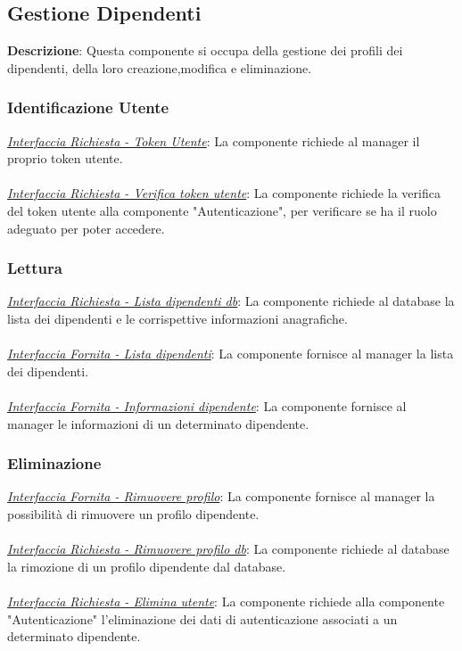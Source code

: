 \documentclass{report}
\begin{document}
\subsection*{Gestione Dipendenti}
\textbf{Descrizione}: Questa componente si occupa della gestione dei profili dei dipendenti, della loro creazione,modifica e eliminazione.
\subsubsection*{\indent \indent Identificazione Utente}
\uline{\textit{Interfaccia Richiesta - Token Utente}}:
La componente richiede al manager il proprio token utente. \\ \\
\uline{\textit{Interfaccia Richiesta - Verifica token utente}}: 
La componente richiede la verifica del token utente alla componente "Autenticazione", per verificare se ha il ruolo adeguato per poter accedere.
\subsubsection*{\indent \indent Lettura}
\uline{\textit{Interfaccia Richiesta - Lista dipendenti db}}:
La componente richiede al database la lista dei dipendenti e le corrispettive informazioni anagrafiche.\\\\
\uline{\textit{Interfaccia Fornita - Lista dipendenti}}:
La componente fornisce al manager la lista dei dipendenti.\\\\
\uline{\textit{Interfaccia Fornita - Informazioni dipendente}}:
La componente fornisce al manager le informazioni di un determinato dipendente.
\subsubsection*{\indent \indent Eliminazione}
\uline{\textit{Interfaccia Fornita - Rimuovere profilo}}:
La componente fornisce al manager la possibilità di rimuovere un profilo dipendente.\\\\
\uline{\textit{Interfaccia Richiesta - Rimuovere profilo db}}:
La componente richiede al database la rimozione di un profilo dipendente dal database.\\\\
\uline{\textit{Interfaccia Richiesta - Elimina utente}}:
La componente richiede alla componente "Autenticazione" l'eliminazione dei dati di autenticazione associati a un determinato dipendente. 
\end{document}
